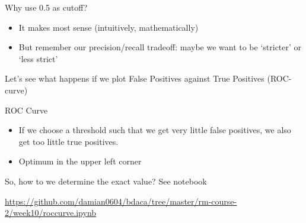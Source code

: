 \documentclass{beamer}
\begin{document}
\begin{frame}{Why use 0.5 as cutoff?}
\begin{itemize}[<+->]
	\item It makes most sense (intuitively, mathematically)
	\item But remember our precision/recall tradeoff: maybe we want to be `stricter' or `less strict'
\end{itemize}
\pause
Let's see what happens if we plot False Positives against True Positives (ROC-curve)
\end{frame}


\begin{frame}{ROC Curve}
\begin{itemize}
	\item If we choose a threshold such that we get very little false positives, we also get too little true positives.
	\item Optimum in the upper left corner
\end{itemize}

\end{frame}


\begin{frame}{So, how to we determine the exact value? }
See notebook

\url{https://github.com/damian0604/bdaca/tree/master/rm-course-2/week10/roccurve.ipynb}
\end{frame}
\end{document}
